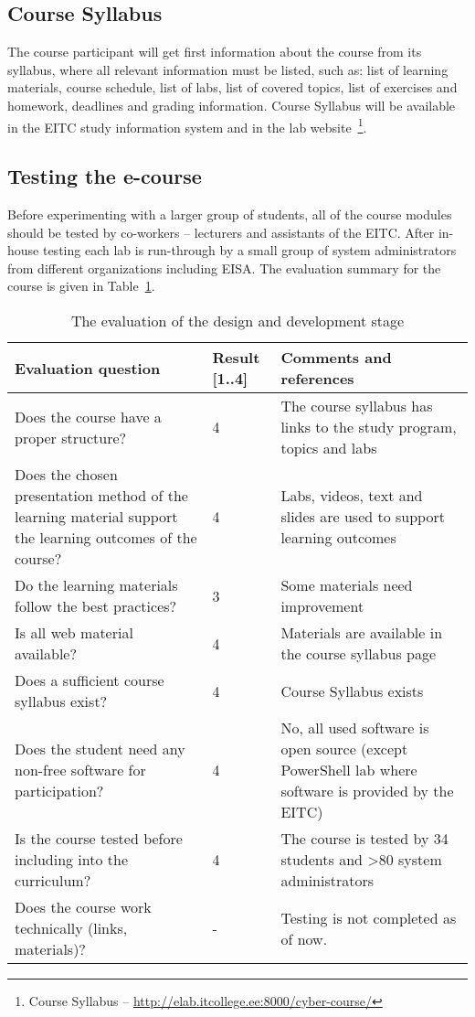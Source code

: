 \subsection{Course Syllabus}
\label{Course Syllabus}
The course participant will get first information about the course from its syllabus, where all relevant information must be listed, such as: list of learning materials, course schedule, list of labs, list of covered topics, list of exercises and homework, deadlines and grading information. Course Syllabus will be available in the \gls{EITC} study information system and in the lab website~\footnote{Course Syllabus -- \url{http://elab.itcollege.ee:8000/cyber-course/}}.

\subsection{Testing the e-course}
Before experimenting with a larger group of students, all of the course modules should be  tested by co-workers -- lecturers and assistants of the \gls{EITC}. After in-house testing each lab is run-through by a small group of system administrators from different organizations including \gls{EISA}. The evaluation summary for the course is given in Table~\ref{table:desing_develop_evaluation}.
\begin{table}[h]
\centering
\caption{The evaluation of the design and development stage }
{ \small 
\begin{tabular}{|p{6cm}|p{2cm}|p{5cm}|}
\hline 
\color{blue} Evaluation question & \color{blue} Result [1..4] & \color{blue} Comments and references \\
\hline
Does the course have a proper structure? 
& 4  &  The course syllabus has links to the  study program, topics and labs  \\ 
\hline
Does the chosen presentation method of the learning material support the learning outcomes of the course? 
& 4  &  Labs, videos, text and slides are used to support learning outcomes \\ 
\hline

Do the learning materials follow the best practices? 
& 3  &  Some materials need improvement \\ 
\hline
Is all web material available? 
& 4  &  Materials are available in the course syllabus page \\ 
\hline
Does a sufficient course syllabus exist? 
& 4  &  Course Syllabus exists \\ 
\hline 
Does the student need any non-free software for participation?
& 4 &  No, all used software is open source (except PowerShell lab where software is provided by the \gls{EITC}) \\ 
\hline 
Is the course tested before including into the curriculum?
& 4 & The course is tested by 34 students and >80 system administrators \\ 
\hline
Does the course work technically (links, materials)?
& - & Testing is not completed as of now.\\ 
\hline 
\end{tabular} 
}
\label{table:desing_develop_evaluation}
\end{table}


